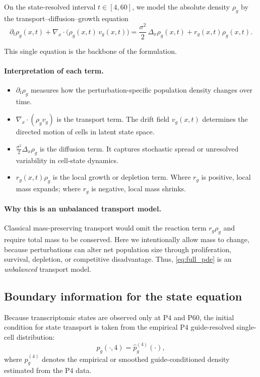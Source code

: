 \documentclass[11pt]{article}
\newcommand{\1}{\mathbf{1}}
\newcommand{\Pfour}{\mathrm{P4}}
\newcommand{\Psixty}{\mathrm{P60}}
\theoremstyle{plain}
\begin{document}
On the state-resolved interval $t \in [4,60]$, we model the absolute density $\rho_g$ by the transport--diffusion--growth equation
\begin{equation}
\partial_t \rho_g(x,t)
+
\nabla_x\cdot\big(\rho_g(x,t)\,v_g(x,t)\big)
=
\frac{\sigma^2}{2}\,\Delta_x \rho_g(x,t)
+
r_g(x,t)\rho_g(x,t).
\label{eq:full_pde}
\end{equation}

This single equation is the backbone of the formulation.

\paragraph{Interpretation of each term.}
\begin{itemize}
    \item $\partial_t\rho_g$ measures how the perturbation-specific population density changes over time.
    \item $\nabla_x\cdot(\rho_g v_g)$ is the transport term. The drift field $v_g(x,t)$ determines the directed motion of cells in latent state space.
    \item $\frac{\sigma^2}{2}\Delta_x \rho_g$ is the diffusion term. It captures stochastic spread or unresolved variability in cell-state dynamics.
    \item $r_g(x,t)\rho_g$ is the local growth or depletion term. Where $r_g$ is positive, local mass expands; where $r_g$ is negative, local mass shrinks.
\end{itemize}

\paragraph{Why this is an unbalanced transport model.}
Classical mass-preserving transport would omit the reaction term $r_g\rho_g$ and require total mass to be conserved. Here we intentionally allow mass to change, because perturbations can alter net population size through proliferation, survival, depletion, or competitive disadvantage. Thus, \eqref{eq:full_pde} is an \emph{unbalanced} transport model.

\subsection{Boundary information for the state equation}

Because transcriptomic states are observed only at $\Pfour$ and $\Psixty$, the initial condition for state transport is taken from the empirical $\Pfour$ guide-resolved single-cell distribution:
\begin{equation}
 p_g(\cdot,4)=\widehat p_g^{(4)}(\cdot),
 \label{eq:p4_boundary}
\end{equation}
where $\widehat p_g^{(4)}$ denotes the empirical or smoothed guide-conditioned density estimated from the $\Pfour$ data.
\end{document}

